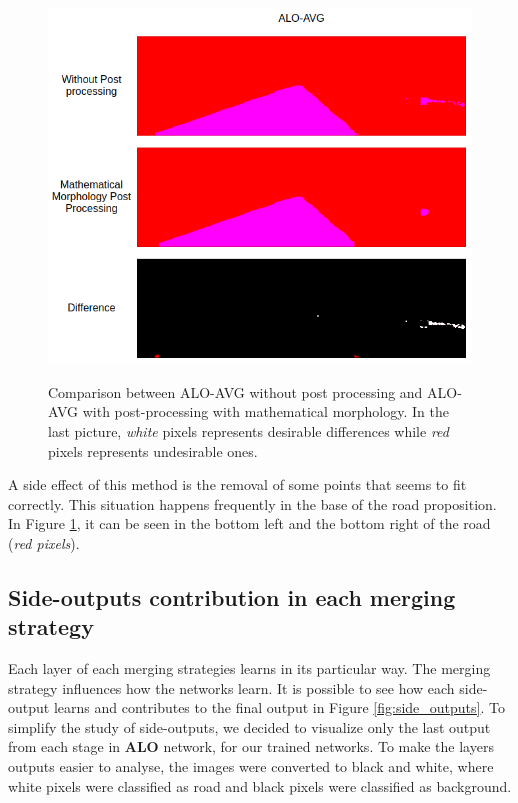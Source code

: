 \begin{figure}
  \caption{Comparison between ALO-AVG without post processing and ALO-AVG with post-processing with mathematical morphology. In the last picture, \textit{white} pixels represents desirable differences while \textit{red} pixels represents undesirable ones.}
  \centering
  \includegraphics[width=1.\columnwidth]{figures/falreis/post_processing_comparison.png}
  \label{fig:post_processing_comp}
\end{figure}

A side effect of this method is the removal of some points that seems to fit correctly. This situation happens frequently in the base of the road proposition. In Figure \ref{fig:post_processing_comp}, it can be seen in the bottom left and the bottom right of the road (\textit{red pixels}).

\subsection{Side-outputs contribution in each merging strategy}
\label{ssec:merging_learn}

Each layer of each merging strategies learns in its particular way. The merging strategy influences how the networks learn. It is possible to see how each side-output learns and contributes to the final output in Figure \ref{fig:side_outputs}. To simplify the study of side-outputs, we decided to visualize only the last  output from each stage in \textbf{ALO} network, for our trained networks. To make the layers outputs easier to analyse, the images were  converted to black and white, where white pixels were classified as road and black pixels were classified as background.

